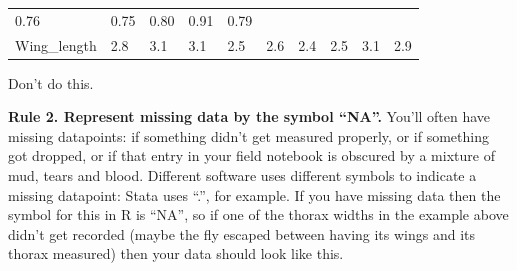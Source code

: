 \documentclass[
]{book}
\begin{document}
\begin{longtable}[]{@{}llllllllll@{}}
\begin{minipage}[t]{0.06\columnwidth}
0.76\strut
\end{minipage} & \begin{minipage}[t]{0.08\columnwidth}\raggedright
0.75\strut
\end{minipage} & \begin{minipage}[t]{0.06\columnwidth}\raggedright
0.80\strut
\end{minipage} & \begin{minipage}[t]{0.08\columnwidth}\raggedright
0.91\strut
\end{minipage} & \begin{minipage}[t]{0.08\columnwidth}\raggedright
0.79\strut
\end{minipage}\tabularnewline
\begin{minipage}[t]{0.08\columnwidth}\raggedright
Wing\_length\strut
\end{minipage} & \begin{minipage}[t]{0.08\columnwidth}\raggedright
2.8\strut
\end{minipage} & \begin{minipage}[t]{0.08\columnwidth}\raggedright
3.1\strut
\end{minipage} & \begin{minipage}[t]{0.08\columnwidth}\raggedright
3.1\strut
\end{minipage} & \begin{minipage}[t]{0.06\columnwidth}\raggedright
2.5\strut
\end{minipage} & \begin{minipage}[t]{0.06\columnwidth}\raggedright
2.6\strut
\end{minipage} & \begin{minipage}[t]{0.08\columnwidth}\raggedright
2.4\strut
\end{minipage} & \begin{minipage}[t]{0.06\columnwidth}\raggedright
2.5\strut
\end{minipage} & \begin{minipage}[t]{0.08\columnwidth}\raggedright
3.1\strut
\end{minipage} & \begin{minipage}[t]{0.08\columnwidth}\raggedright
2.9\strut
\end{minipage}\tabularnewline
\bottomrule
\end{longtable}

Don't do this.

\textbf{Rule 2. Represent missing data by the symbol ``NA''.}
You'll often have missing datapoints: if something didn't get measured properly, or if something got dropped, or if that entry in your field notebook is obscured by a mixture of mud, tears and blood. Different software uses different symbols to indicate a missing datapoint: Stata uses ``.'', for example. If you have missing data then the symbol for this in R is ``NA'', so if one of the thorax widths in the example above didn't get recorded (maybe the fly escaped between having its wings and its thorax measured) then your data should look like this.
\end{document}

